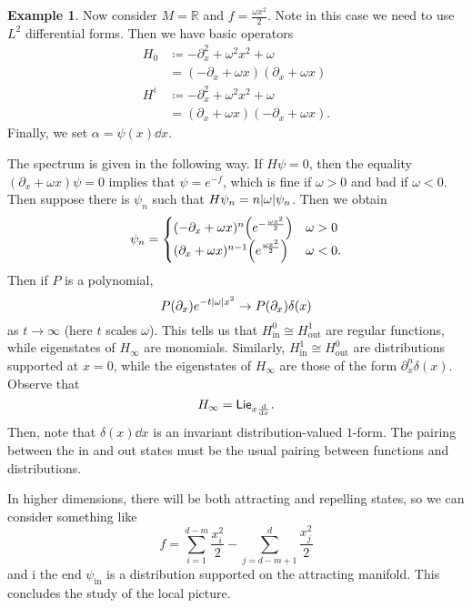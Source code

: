 \documentclass[leqno, openany]{memoir}
\theoremstyle{definition}
\newtheorem{exm}[thm]{Example}
\theoremstyle{remark}
\theoremstyle{plain}
\theoremstyle{definition}
\theoremstyle{remark}
\newcommand{\R}{\mathbb{R}}
\newcommand{\mr}[1]{\mathrm{#1}}
\newcommand{\ms}[1]{\mathsf{#1}}
\begin{document}
\begin{exm}
    Now consider $M = \R$ and $f = \frac{\omega x^2}{2}$. Note in this case we need to use $L^2$ differential forms. Then we have basic operators
    \begin{align*}
        H_0 &\coloneqq -\partial_x^2 + \omega^2 x^2 + \omega \\
        &= (-\partial_x + \omega x)(\partial_x + \omega x) \\
        H^i &\coloneqq -\partial_x^2 + \omega^2 x^2 + \omega \\
        &= (\partial_x + \omega x)(-\partial_x + \omega x).
    \end{align*}
    Finally, we set $\alpha = \psi(x) \dd{x}$.

    The spectrum is given in the following way. If $H\psi = 0$, then the equality $(\partial_x + \omega x)\psi = 0$ implies that $\psi = e^{-f}$, which is fine if $\omega > 0$ and bad if $\omega < 0$. Then suppose there is $\psi_n$ such that $H \psi_n = n \abs{\omega} \psi_n$. Then we obtain
    \[ \psi_n = \begin{cases}
        (-\partial_x + \omega x)^n \qty(e^{-\frac{\omega x^2}{2}}) & \omega > 0 \\
        (\partial_x + \omega x)^{n-1} \qty(e^{\frac{\omega x^2}{2}}) & \omega < 0 .
    \end{cases}
    \]
    Then if $P$ is a polynomial,
    \[ P(\partial_x) e^{-t \abs{\omega}x^2} \to P(\partial_x) \delta(x) \]
    as $t \to \infty$ (here $t$ scales $\omega$). This tells us that $H_{\mr{in}}^0 \cong H^1_{\mr{out}}$ are regular functions, while eigenstates of $H_{\infty}$ are monomials. Similarly, $H^1_{\mr{in}} \cong H^0_{\mr{out}}$ are distributions supported at $x=0$, while the eigenstates of $H_{\infty}$ are those of the form $\partial_x^n \delta(x)$. Observe that
    \[ H_{\infty} = \ms{Lie}_{x \dv{x}}. \]
    Then, note that $\delta(x) \dd{x}$ is an invariant distribution-valued $1$-form. The pairing between the in and out states must be the usual pairing between functions and distributions.
\end{exm}

In higher dimensions, there will be both attracting and repelling states, so we can consider something like
\[ f = \sum_{i=1}^{d-m} \frac{x_i^2}{2} - \sum_{j=d-m+1}^d \frac{x_j^2}{2} \]
and i the end $\psi_{\mr{in}}$ is a distribution supported on the attracting manifold. This concludes the study of the local picture.
\end{document}
